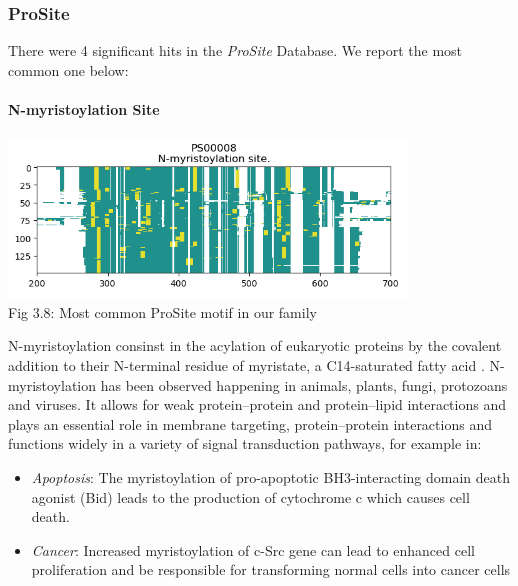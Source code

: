 \documentclass[10pt,twocolumn,letterpaper]{article}
\begin{document}

\subsubsection{ProSite}

There were 4 significant hits in the \textit{ProSite} Database. We report the most common one below:

\paragraph{N-myristoylation Site}

\begin{center}
    \includegraphics[scale=1]{report/img/prosite.png} \\
    \small{Fig 3.8: Most common ProSite motif in our family}
\end{center}

N-myristoylation consinst in the acylation of eukaryotic proteins by the covalent addition to their N-terminal residue of myristate, a C14-saturated fatty acid \cite{N-myristoylation}.
N-myristoylation has been observed happening in animals, plants, fungi, protozoans and viruses. It allows for weak protein–protein and protein–lipid interactions and plays an essential role in membrane targeting, protein–protein interactions and functions widely in a variety of signal transduction pathways, for example in:
\begin{itemize}
    \item \textit{Apoptosis}: The myristoylation of pro-apoptotic BH3-interacting domain death agonist (Bid) leads to the production of cytochrome c which causes cell death.

    \item \textit{Cancer}: Increased myristoylation of c-Src gene can lead to enhanced cell proliferation and be responsible for transforming normal cells into cancer cells
\end{itemize} \\
\end{document}
